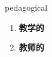 
\begin{frame}
{\huge pedagogical}
\begin{center}
\begin{enumerate}\Large
  \item \textbf{教学的}
  \item \textbf{教师的}
\end{enumerate}
\end{center}
\end{frame}

